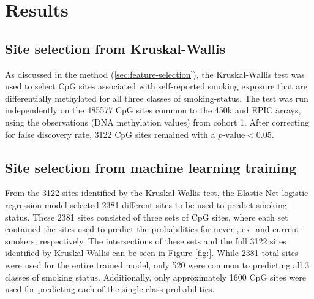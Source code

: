 \documentclass{article}
\begin{document}
\section{Results} \label{sec:results}

\subsection{Site selection from Kruskal-Wallis}
As discussed in the method (\ref{sec:feature-selection}), the Kruskal-Wallis test was used to select CpG sites associated with self-reported smoking exposure that are differentially methylated for all three classes of smoking-status. The test was run independently on the \num{485577} CpG sites common to the 450k and EPIC arrays, using the observations (DNA methylation values) from cohort 1. After correcting for false discovery rate, \num{3122} CpG sites remained with a \(p\text{-value} < 0.05\).


\subsection{Site selection from machine learning training}
From the \num{3122} sites identified by the Kruskal-Wallis test, the Elastic Net logistic regression model selected \num{2381} different sites to be used to predict smoking status. These \num{2381} sites consisted of three sets of CpG sites, where each set contained the sites used to predict the probabilities for never-, ex- and current-smokers, respectively.
The intersections of these sets and the full \num{3122} sites identified by Kruskal-Wallis can be seen in Figure \ref{fig:}. While \num{2381} total sites were used for the entire trained model, only \num{520} were common to predicting all 3 classes of smoking status. Additionally, only approximately 1600 CpG sites were used for predicting each of the single class probabilities.
\end{document}
